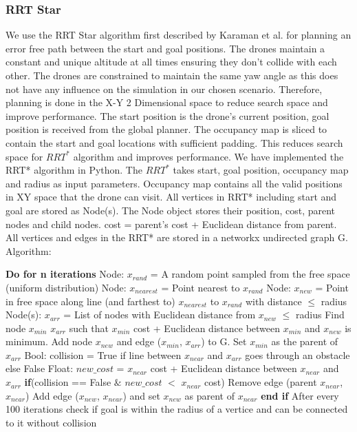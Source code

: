 \subsubsection{RRT Star}
We use the RRT Star algorithm first described by Karaman et al.\cite{karaman2011sampling} for planning an error free path between the start and goal positions.
The drones maintain a constant and unique altitude at all times ensuring they don't collide with each other.
The drones are constrained to maintain the same yaw angle as this does not have any influence on the simulation in our chosen scenario.
Therefore, planning is done in the X-Y 2 Dimensional space to reduce search space and improve performance.
The start position is the drone's current position, goal position is received from the global planner.
The occupancy map is sliced to contain the start and goal locations with sufficient padding.
This reduces search space for $RRT^*$ algorithm and improves performance.
We have implemented the RRT* algorithm in Python.
The $RRT^*$ takes start, goal position, occupancy map and radius as input parameters.
Occupancy map contains all the valid positions in XY space that the drone can visit.
All vertices in RRT* including start and goal are stored as Node(s).
The Node object stores their position, cost, parent nodes and child nodes.
cost = parent's cost + Euclidean distance from parent.
All vertices and edges in the RRT* are stored in a networkx\cite{SciPyProceedings_11} undirected graph G.
Algorithm:
\begin{algorithmic}[1]
    \State \textbf{Do for n iterations}
    \State Node: $x_{rand}$ = A random point sampled from the free space (uniform distribution)
    \State Node: $x_{nearest}$ = Point nearest to $x_{rand}$
    \State Node: $x_{new}$ = Point in free space along line (and farthest to) $x_{nearest}$ to $x_{rand}$ with distance $\leq$ radius
    \State Node(s): $x_{arr}$ = List of nodes with Euclidean distance from $x_{new}$ $\leq$ radius
    \State Find node $x_{min}$ \in $x_{arr}$ such that $x_{min}$ cost + Euclidean distance between $x_{min}$ and $x_{new}$ is minimum.
    \State Add node $x_{new}$ and edge ($x_{min}$, $x_{arr}$) to G. Set $x_{min}$ as the parent of $x_{arr}$
    \State Bool: collision = True if line between $x_{near}$ and $x_{arr}$ goes through an obstacle else False
    \State Float: $new\_cost$ = $x_{near}$ cost + Euclidean distance between $x_{near}$ and $x_{arr}$
    \State \textbf{if}(collision == False $\&$ $new\_cost$ $<$ $x_{near}$ cost)
    \State\hspace{\algorithmicindent} Remove edge (parent $x_{near}$, $x_{near}$)
    \State\hspace{\algorithmicindent} Add edge ($x_{new}$, $x_{near}$) and set $x_{new}$ as parent of $x_{near}$
    \State \textbf{end if}
    \EndFor
    \State After every 100 iterations check if goal is within the radius of a vertice and can be connected to it without collision
\end{algorithmic}
